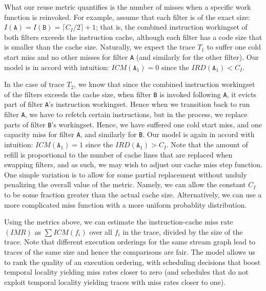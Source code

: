 What our reuse metric quantifies is the number of misses when a specific work
function is reinvoked. For example, assume that each filter is of the exact
size: $I(\texttt{A}) = I(\texttt{B}) = \lceil{C_I / 2}\rceil + 1$;
that is, the combined instruction workingset of both filters exceeds
the instruction cache, although each filter has a code size that is
smaller than the cache size. Naturally, we expect the trace $T_1$ to
suffer one cold start miss and no other misses for filter \texttt{A}
(and similarly for the other filter). Our model is in accord with
intuition:  $ICM(\texttt{A}_1) = 0$ since
the $IRD(\texttt{A}_1) < C_I$.

In the case of trace $T_2$, we know that since the combined
instruction workingset of the filters exceeds the cache size, when
filter \texttt{B} is invoked following \texttt{A}, it evicts part of
filter \texttt{A}'s instruction workingset. Hence when we transition
back to run filter \texttt{A}, we have to refetch certain
instructions, but in the process, we replace parts of filter
\texttt{B}'s workingset. Hence, we have suffered one cold start miss,
and one capacity miss for filter \texttt{A}, and similarly for
\texttt{B}. Our model is again in accord with intuition: 
$ICM(\texttt{A}_1) = 1$ since
the $IRD(\texttt{A}_1) > C_I$. Note that the
amount of refill is proportional to the number of cache lines that are
replaced when swapping filters, and as such, we may wish to adjust
our cache miss step function. One simple variation is to allow for
some partial replacement without unduly penalizing the overall value
of the metric. Namely, we can allow the constant $C_I$ to be some
fraction greater than the actual cache size. Alternatively, we can use
a more complicated miss function with a more uniform probablity
distribution.

Using the metrics above, we can estimate the instruction-cache miss
rate $(IMR)$ as $\sum ICM(f_i)$ over all $f_i$ in the trace, divided
by the size of the trace. Note that different execution orderings for
the same stream graph lead to traces of the same size and hence the
comparisons are fair. The model allows us to rank the quality of an
execution ordering, with scheduling decisions that boost temporal
locality yielding miss rates closer to zero (and schedules that do not
exploit temporal locality yielding traces with miss rates closer to
one).

